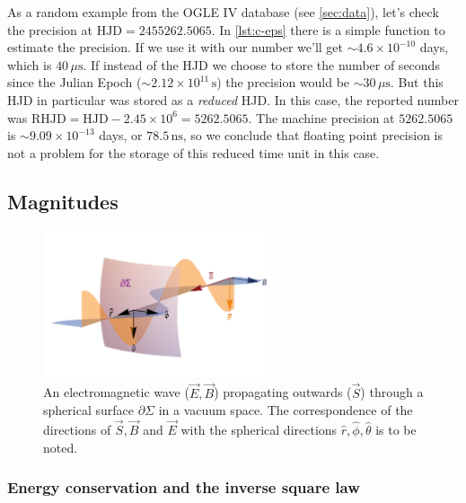 	
	As a random example from the OGLE IV database (see \autoref{sec:data}), let's check the precision at $\text{HJD}=2455262.5065$. 
	In \autoref{lst:c-eps} there is a simple function to estimate the precision. 
	If we use it with our number we'll get $\sim 4.6\times 10^{-10}$ days, which is $40 \,\mu \text{s}$. 
	If instead of the HJD we choose to store the number of seconds since the Julian Epoch ($\sim 2.12\times 10^{11} \,\text{s}$) 
	the precision would be $\sim 30 \,\mu \text{s}$.
	But this HJD in particular was stored as a \textit{reduced} HJD. In this case, the reported number was $\text{RHJD}=\text{HJD}-2.45\times 10^6 = 5262.5065$.
	The machine precision at $5262.5065$ is $\sim 9.09\times 10^{-13} $ days, or $78.5 \,\text{ns}$, 
	so we conclude that floating point precision is not a problem for the storage of this reduced time unit in this case.
	
\subsection{Magnitudes}

	\begin{figure}[H]
		\centering
		\includegraphics[width=0.6\textwidth]{img/Spherical_EM.pdf}
		\caption[Electromagnetic wave propagation through a spherical surface]{
			An electromagnetic wave ($\vec E,\vec B$) propagating outwards ($\vec S$) through a spherical surface $\partial \Sigma$ in a vacuum space.
			The correspondence of the directions of $\vec S,\vec B$ and $\vec E$ with the spherical directions $\hat r,\hat \phi, \hat \theta$ is to be noted.
		}
		\label{fig:spherical-em}
	\end{figure}
	
	\subsubsection{Energy conservation and the inverse square law}

